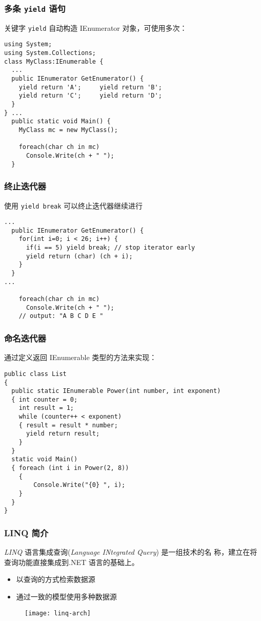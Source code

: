 \begin{frame}[fragile]
\frametitle{多条 \texttt{yield} 语句}
\CJKindent 关键字 \texttt{yield} 自动构造 IEnumerator 对象，可使用多次：
\begin{lstlisting}
using System;
using System.Collections;
class MyClass:IEnumerable {
  ...
  public IEnumerator GetEnumerator() {
    yield return 'A';     yield return 'B';
    yield return 'C';     yield return 'D';
  }
} ...
  public static void Main() {
    MyClass mc = new MyClass();

    foreach(char ch in mc)
      Console.Write(ch + " ");
  }
\end{lstlisting}
\end{frame}

\begin{frame}[fragile]
\frametitle{终止迭代器}
使用 \texttt{yield break} 可以终止迭代器继续进行
\begin{lstlisting}
...
  public IEnumerator GetEnumerator() {
    for(int i=0; i < 26; i++) {
      if(i == 5) yield break; // stop iterator early
      yield return (char) (ch + i);
    }
  }
...

    foreach(char ch in mc)
      Console.Write(ch + " ");
    // output: "A B C D E "
\end{lstlisting}
\end{frame}

\begin{frame}[fragile]
\frametitle{命名迭代器}
通过定义返回 IEnumerable 类型的方法来实现：
\begin{lstlisting}
public class List
{
  public static IEnumerable Power(int number, int exponent)
  { int counter = 0;
    int result = 1;
    while (counter++ < exponent)
    { result = result * number;
      yield return result;
    }
  }
  static void Main()
  { foreach (int i in Power(2, 8))
    {
        Console.Write("{0} ", i);
    }
  }
}
\end{lstlisting}
\end{frame}

\begin{frame}
\frametitle{LINQ 简介}

\begin{block}{\textit{LINQ}}
  \CJKindent 语言集成查询(\textit{Language INtegrated Query}) 是一组技术的名
  称，建立在将查询功能直接集成到.NET 语言的基础上。
\end{block}

\begin{itemize}
\item 以查询的方式检索数据源
\item 通过一致的模型使用多种数据源
\end{itemize}

\begin{figure}[htbp]
  \centering \texttt{[image: linq-arch]}
\end{figure}
\end{frame}


